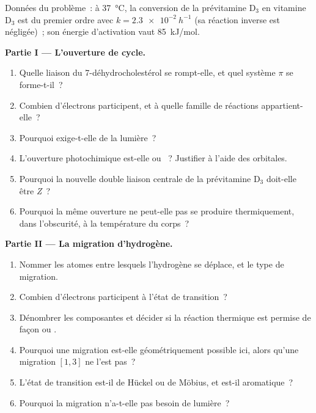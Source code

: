 \begin{problem}
\label{pb:b3:pericyclic:1}
Données du problème~: à \qty{37}{\celsius}, la conversion de la prévitamine D$_3$ en vitamine D$_3$ est
du premier ordre avec $k = \qty{2.3e-2}{h^{-1}}$ (sa réaction inverse est négligée)~; son énergie d'activation vaut
\qty{85}{kJ/mol}.

\medskip\noindent\textbf{Partie I --- L'ouverture de cycle.}
\begin{enumerate}
  \item Quelle liaison du 7-déhydrocholestérol se rompt-elle, et quel système $\pi$ se forme-t-il~?
  \item Combien d'électrons participent, et à quelle famille de réactions
        appartient-elle~?
  \item Pourquoi exige-t-elle de la lumière~?
  \item L'ouverture photochimique est-elle  ou ~?
        Justifier à l'aide des orbitales.
  \item Pourquoi la nouvelle double liaison centrale de la prévitamine D$_3$ doit-elle être \textit{Z}~?
  \item Pourquoi la même ouverture ne peut-elle pas se produire
        thermiquement, dans l'obscurité, à la température du corps~?
\end{enumerate}

\medskip\noindent\textbf{Partie II --- La migration d'hydrogène.}
\begin{enumerate}[resume]
  \item Nommer les atomes entre lesquels l'hydrogène se déplace, et le type
        de migration.
  \item Combien d'électrons participent à l'état de transition~?
  \item Dénombrer les composantes et décider si la réaction thermique est
        permise de façon  ou .
  \item Pourquoi une migration  est-elle géométriquement possible ici, alors qu'une migration $[1,3]$
        ne l'est pas~?
  \item L'état de transition est-il de Hückel ou de Möbius, et est-il
        aromatique~?
  \item Pourquoi la migration n'a-t-elle pas besoin de lumière~?
\end{enumerate}


\end{problem}
